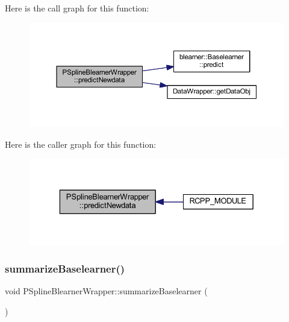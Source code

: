 Here is the call graph for this function\+:\nopagebreak
\begin{figure}[H]
\begin{center}
\leavevmode
\includegraphics[width=350pt]{class_p_spline_blearner_wrapper_af90fe0fce13519086f8e54fe4d2cc539_cgraph}
\end{center}
\end{figure}
Here is the caller graph for this function\+:\nopagebreak
\begin{figure}[H]
\begin{center}
\leavevmode
\includegraphics[width=329pt]{class_p_spline_blearner_wrapper_af90fe0fce13519086f8e54fe4d2cc539_icgraph}
\end{center}
\end{figure}
\mbox{\label{class_p_spline_blearner_wrapper_a7796ee928de438649ede7aa1aa57263a}} 
\subsubsection{\texorpdfstring{summarize\+Baselearner()}{summarizeBaselearner()}}
{\footnotesize\ttfamily void P\+Spline\+Blearner\+Wrapper\+::summarize\+Baselearner (\begin{DoxyParamCaption}{ }\end{DoxyParamCaption})\hspace{0.3cm}{\ttfamily [inline]}}


